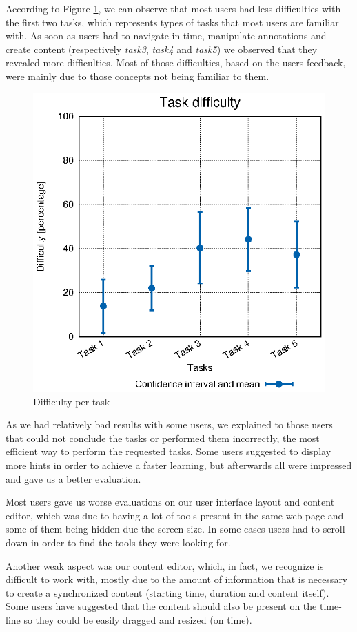 \documentclass[conference,compsoc,a4paper]{IEEEtran}
\begin{document}
According to Figure \ref{fig:user_diffs}, we can observe that most users had less difficulties with the first two tasks, which represents types of tasks that most users are familiar with. As soon as users had to navigate in time, manipulate annotations and create content (respectively \emph{task3}, \emph{task4} and \emph{task5}) we observed that they revealed more difficulties. Most of those difficulties, based on the users feedback, were mainly due to those concepts not being familiar to them.



\begin{figure}
  \centering
    \includegraphics[width=0.8\linewidth]{stats/user_diffs.eps}
  \caption{Difficulty per task}
  \label{fig:user_diffs}
\end{figure}


As we had relatively bad results with some users, we explained to those users that could not conclude the tasks or performed them incorrectly, the most efficient way to perform the requested tasks. Some users suggested to display more hints in order to achieve a faster learning, but afterwards all were impressed and gave us a better evaluation.

Most users gave us worse evaluations on our user interface layout and content editor, which was due to having a lot of tools present in the same web page and some of them being hidden due the screen size. In some cases users had to scroll down in order to find the tools they were looking for. 

Another weak aspect was our content editor, which, in fact, we recognize is difficult to work with, mostly due to the amount of information that is necessary to create a synchronized content (starting time, duration and content itself). Some users have suggested that the content should also be present on the time-line so they could be easily dragged and resized (on time).
\end{document}
